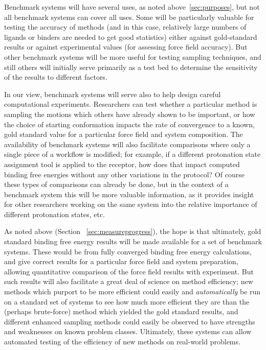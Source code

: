 \documentclass[aps,pre,twocolumn,nofootinbib,superscriptaddress,10pt, final,tightenlines]{revtex4-1}
\begin{document}
Benchmark systems will have several uses, as noted above~\ref{sec:purposes}, but not all benchmark systems can cover all uses. 
Some will be particularly valuable for testing the accuracy of methods (and in this case, relatively large numbers of ligands or binders are needed to get good statistics) either against gold-standard results or against experimental values (for assessing force field accuracy). 
But other benchmark systems will be more useful for testing sampling techniques, and still others will initially serve primarily as a test bed to determine the sensitivity of the results to different factors.

In our view, benchmark systems will serve also to help design careful computational experiments. 
Researchers can test whether a particular method is sampling the motions which others have already shown to be important, or how the choice of starting conformation impacts the rate of convergence to a known, gold standard value for a particular force field and system composition. 
The availability of benchmark systems will also facilitate comparisons where only a single piece of a workflow is modified; for example, if a different protonation state assignment tool is applied to the receptor, how does that impact computed binding free energies without any other variations in the protocol? 
Of course these types of comparisons can already be done, but in the context of a benchmark system this will be more valuable information, as it provides insight for other researchers working on the same system into the relative importance of different protonation states, etc. 

As noted above (Section ~\ref{sec:measureprogress}), the hope is that ultimately, gold standard binding free energy results will be made available for a set of benchmark systems. 
These would be from fully converged binding free energy calculations, and give correct results for a particular force field and system preparation, allowing quantitative comparison of the force field results with experiment. 
But such results will also facilitate a great deal of science on method efficiency; new methods which purport to be more efficient could easily and \emph{automatically} be run on a standard set of systems to see how much more efficient they are than the (perhaps brute-force) method which yielded the gold standard results, and different enhanced sampling methods could easily be observed to have strengths and weaknesses on known problem classes. 
Ultimately, these systems can allow automated testing of the efficiency of new methods on real-world problems. 
\end{document}
